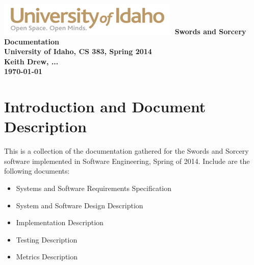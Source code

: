 \documentclass[12pt,a4paper]{article}
\begin{document}
\begin{titlepage}
    \centering
    \vfill
    \vfill
    \includegraphics{UIGraphic}
    \vfill
    {\bfseries\Large
        Swords and Sorcery Documentation\\
        University of Idaho, CS 383, Spring 2014\\
        \vskip2cm
        Keith Drew, ... \\
        \vskip2cm
        \today
    }    
    \vfill
\end{titlepage}

\section{Introduction and Document Description}
This is a collection of the documentation gathered for the Swords and Sorcery software implemented in Software Engineering, Spring of 2014. Include are the following documents:
\begin{itemize}
\item Systems and Software Requirements Specification
\item System and Software Design Description
\item Implementation Description
\item Testing Description
\item Metrics Description
\end{itemize}
\end{document}
